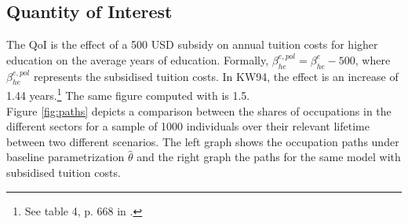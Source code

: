\subsection{Quantity of Interest}

The QoI is the effect of a 500 USD subsidy on annual tuition costs for higher education on the average years of education. Formally, $\beta_{he}^{e,pol} = \beta_{he}^e - 500$, where $\beta_{he}^{e,pol}$ represents the subsidised tuition costs. In KW94, the effect is an increase of 1.44 years.\footnote{See table 4, p. 668 in \cite{Keane.1994}.} The same figure computed with  is 1.5.\\
\newline
Figure \ref{fig:paths} depicts a comparison between the shares of occupations in the different sectors for a sample of 1000 individuals over their relevant lifetime between two different scenarios. The left graph shows the occupation paths under baseline parametrization $\hat{\theta}$ and the right graph the paths for the same model with subsidised tuition costs.

